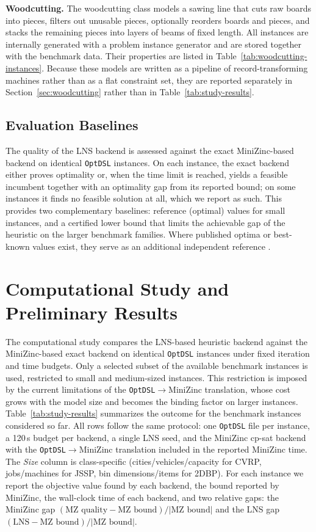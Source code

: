 \documentclass[11pt,a4paper]{article}
\begin{document}
\textbf{Woodcutting.}
The woodcutting class models a sawing line that cuts raw boards into pieces,
filters out unusable pieces, optionally reorders boards and pieces, and stacks
the remaining pieces into layers of beams of fixed length.
All instances are internally generated with a problem instance generator and
are stored together with the benchmark data.
Their properties are listed in Table~\ref{tab:woodcutting-instances}.
Because these models are written as a pipeline of record-transforming
machines rather than as a flat constraint set, they are reported separately in
Section~\ref{sec:woodcutting} rather than in
Table~\ref{tab:study-results}.

\subsection{Evaluation Baselines}
The quality of the LNS backend is assessed against the exact MiniZinc-based
backend on identical \texttt{OptDSL} instances.
On each instance, the exact backend either proves optimality or, when the
time limit is reached, yields a feasible incumbent together with an
optimality gap from its reported bound; on some instances it finds no feasible
solution at all, which we report as such.
This provides two complementary baselines: reference (optimal) values for
small instances, and a certified lower bound that limits the achievable gap of
the heuristic on the larger benchmark families.
Where published optima or best-known values exist, they serve as an
additional independent reference
\citep{applegate1991,nowicki1996fast,taillard1993benchmarks,uchoa2017cvrplib,martello1998exact}.

\section{Computational Study and Preliminary Results}
The computational study compares the LNS-based heuristic backend against the
MiniZinc-based exact backend on identical \texttt{OptDSL} instances under
fixed iteration and time budgets.
Only a selected subset of the available benchmark instances is used, restricted
to small and medium-sized instances.
This restriction is imposed by the current limitations of the
\texttt{OptDSL}$\to$MiniZinc translation, whose cost grows with the model size
and becomes the binding factor on larger instances.
Table~\ref{tab:study-results} summarizes the outcome for the benchmark
instances considered so far.
All rows follow the same protocol: one \texttt{OptDSL} file per instance, a
120\,s budget per backend, a single LNS seed, and the MiniZinc cp-sat backend
with the \texttt{OptDSL}$\to$MiniZinc translation included in the reported
MiniZinc time.
The \emph{Size} column is class-specific (cities/vehicles/capacity for CVRP,
jobs/machines for JSSP, bin dimensions/items for 2DBP).
For each instance we report the objective value found by each backend, the
bound reported by MiniZinc, the wall-clock time of each backend, and two
relative gaps: the MiniZinc gap
$(\text{MZ quality}-\text{MZ bound})/|\text{MZ bound}|$ and the LNS gap
$(\text{LNS}-\text{MZ bound})/|\text{MZ bound}|$.
\end{document}
